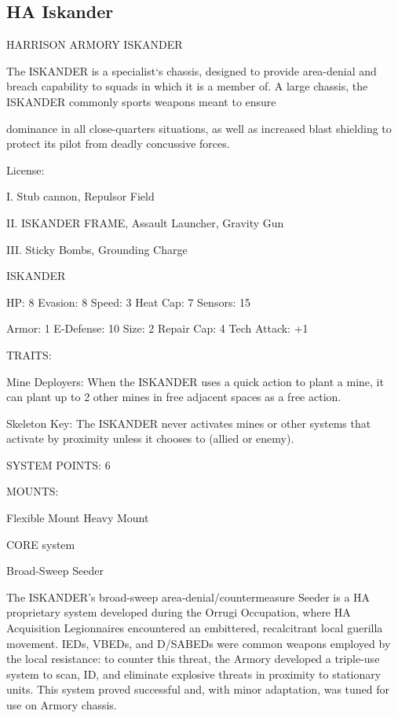 \subsection{HA Iskander}

                              HARRISON ARMORY ISKANDER

The ISKANDER is a specialist‘s chassis, designed to provide area-denial and breach capability to squads in
which it is a member of. A large chassis, the ISKANDER commonly sports weapons meant to ensure

dominance in all close-quarters situations, as well as increased blast shielding to protect its pilot from
deadly concussive forces.

                                                   License:

I. Stub cannon, Repulsor Field

II. ISKANDER FRAME, Assault Launcher, Gravity Gun

III. Sticky Bombs, Grounding Charge


                                                ISKANDER

 HP: 8          Evasion: 8                            Speed: 3           Heat Cap: 7        Sensors: 15

 Armor: 1       E-Defense: 10                         Size: 2            Repair Cap: 4      Tech Attack:
                                                                                            +1

                                                  TRAITS:

 Mine Deployers: When the ISKANDER uses a quick action to plant a mine, it can plant up to 2 other
 mines in free adjacent spaces as a free action.

 Skeleton Key: The ISKANDER never activates mines or other systems that activate by proximity unless
 it chooses to (allied or enemy).

                                            SYSTEM POINTS: 6

                                                  MOUNTS:

 Flexible Mount                    Heavy Mount

                                               CORE system




                                             Broad-Sweep Seeder

 The ISKANDER’s broad-sweep area-denial/countermeasure Seeder is a HA proprietary system
 developed during the Orrugi Occupation, where HA Acquisition Legionnaires encountered an
 embittered, recalcitrant local guerilla movement. IEDs, VBEDs, and D/SABEDs were common weapons
 employed by the local resistance: to counter this threat, the Armory developed a triple-use system to
 scan, ID, and eliminate explosive threats in proximity to stationary units. This system proved successful
 and, with minor adaptation, was tuned for use on Armory chassis.

